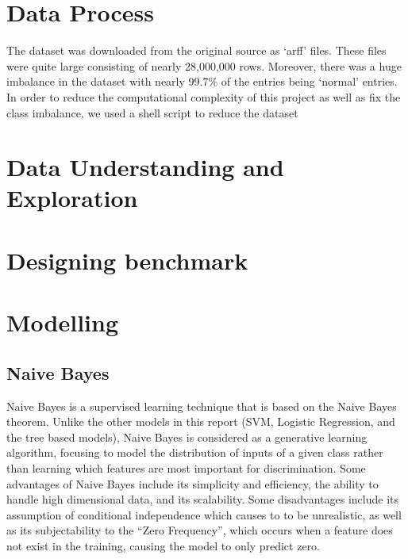 \section{Data Process}
The dataset was downloaded from the original source as `arff' files. These files were quite large consisting of nearly 28,000,000 rows. Moreover, there was a huge imbalance in the dataset with nearly 99.7\% of the entries being `normal' entries. In order to reduce the computational complexity of this project as well as fix the class imbalance, we used a shell script to reduce the dataset 

\section{Data Understanding and Exploration}



\section{Designing benchmark}


\section{Modelling}
\subsection{Naive Bayes}
Naive Bayes is a supervised learning technique that is based on the Naive Bayes theorem. Unlike the other models in this report (SVM, Logistic Regression, and the tree based models), Naive Bayes is considered as a generative learning algorithm, focusing to model the distribution of inputs of a given class rather than learning which features are most important for discrimination. Some advantages of Naive Bayes include its simplicity and efficiency, the ability to handle high dimensional data, and its scalability. Some disadvantages include its assumption of conditional independence which causes to to be unrealistic, as well as its subjectability to the ``Zero Frequency'', which occurs when a feature does not exist in the training, causing the model to only predict zero.

